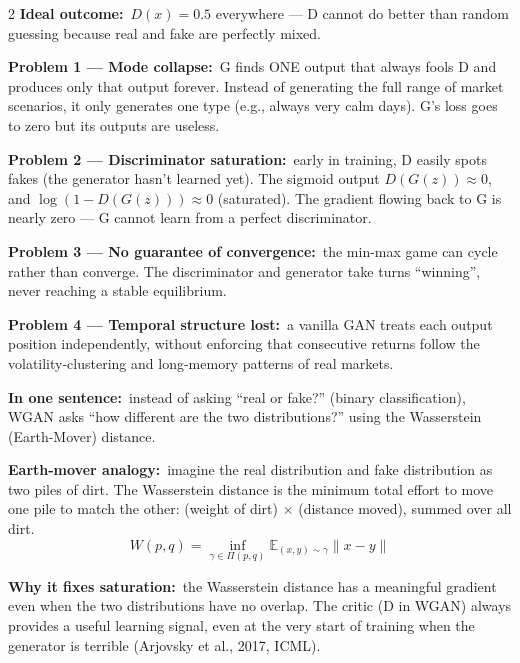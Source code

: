 \documentclass[10pt]{article}
\newcommand{\amberbox}[2]{\begin{tcolorbox}[mybox={Amber}{ABg},title={#1}]#2\end{tcolorbox}}
\newcommand{\redbox}[2]{\begin{tcolorbox}[mybox={DRed}{RBg},title={#1}]#2\end{tcolorbox}}
\newcommand{\E}{\mathbb{E}}
\begin{document}
\begin{multicols}{2}
{\textbf{Ideal outcome:}\ $D(x) = 0.5$ everywhere --- D cannot do better than random guessing because real and fake are perfectly mixed.}

\columnbreak

\amberbox{Why Plain GANs Fail on Financial Data}{%
\textbf{Problem 1 --- Mode collapse:}\ G finds ONE output that always fools D and produces only that output forever. Instead of generating the full range of market scenarios, it only generates one type (e.g., always very calm days). G's loss goes to zero but its outputs are useless.

\smallskip
\textbf{Problem 2 --- Discriminator saturation:}\ early in training, D easily spots fakes (the generator hasn't learned yet). The sigmoid output $D(G(z)) \approx 0$, and $\log(1-D(G(z))) \approx 0$ (saturated). The gradient flowing back to G is nearly zero --- G cannot learn from a perfect discriminator.

\smallskip
\textbf{Problem 3 --- No guarantee of convergence:}\ the min-max game can cycle rather than converge. The discriminator and generator take turns ``winning'', never reaching a stable equilibrium.

\smallskip
\textbf{Problem 4 --- Temporal structure lost:}\ a vanilla GAN treats each output position independently, without enforcing that consecutive returns follow the volatility-clustering and long-memory patterns of real markets.}

\redbox{Fix 1 --- The Wasserstein GAN (WGAN)}{%
\textbf{In one sentence:}\ instead of asking ``real or fake?'' (binary classification), WGAN asks ``how different are the two distributions?'' using the Wasserstein (Earth-Mover) distance.

\smallskip
\textbf{Earth-mover analogy:}\ imagine the real distribution and fake distribution as two piles of dirt. The Wasserstein distance is the minimum total effort to move one pile to match the other: (weight of dirt) $\times$ (distance moved), summed over all dirt.
\begin{equation*}
  W(p,q) = \inf_{\gamma \in \Pi(p,q)} \E_{(x,y)\sim\gamma}\|x-y\|
\end{equation*}

\textbf{Why it fixes saturation:}\ the Wasserstein distance has a meaningful gradient even when the two distributions have no overlap. The critic (D in WGAN) always provides a useful learning signal, even at the very start of training when the generator is terrible (Arjovsky et al., 2017, ICML).}


\end{multicols}
\end{document}
